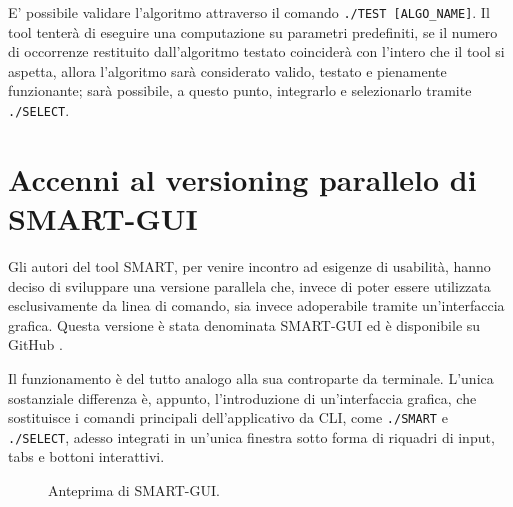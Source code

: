 E' possibile validare l'algoritmo attraverso il comando \verb|./TEST [ALGO_NAME]|. Il tool tenterà di eseguire una computazione su parametri predefiniti, se il numero di occorrenze restituito dall'algoritmo testato coinciderà con l'intero che il tool si aspetta, allora l'algoritmo sarà considerato valido, testato e pienamente funzionante; sarà possibile, a questo punto, integrarlo e selezionarlo tramite \verb|./SELECT|.


\section{Accenni al versioning parallelo di SMART-GUI}

Gli autori del tool SMART, per venire incontro ad esigenze di usabilità, hanno deciso di sviluppare una versione parallela che, invece di poter essere utilizzata esclusivamente da linea di comando, sia invece adoperabile tramite un'interfaccia grafica. Questa versione è stata denominata SMART-GUI ed è disponibile su GitHub \cite{smartGUI}. 

\vspace{3mm}

Il funzionamento è del tutto analogo alla sua controparte da terminale. L'unica sostanziale differenza è, appunto, l'introduzione di un'interfaccia grafica, che sostituisce i comandi principali dell'applicativo da CLI, come \verb|./SMART| e \verb|./SELECT|, adesso integrati in un'unica finestra sotto forma di riquadri di input, tabs e bottoni interattivi.

\vspace{3mm}

\begin{figure}[ht!]
    \centering
    \caption{Anteprima di SMART-GUI.}
    \label{fig:esempio}
\end{figure}


